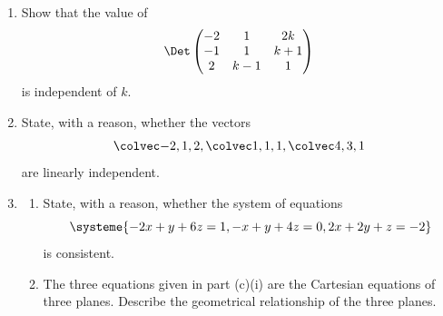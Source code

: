 \begin{problem}
    \begin{enumerate}
        \item Show that the value of \[\Det \begin{pmatrix}-2 & 1 & 2k\\ -1 & 1 & k+1\\ 2 & k-1 & 1\end{pmatrix}\] is independent of $k$.
        \item State, with a reason, whether the vectors \[\cveciii{-2}{1}{2}, \cveciii111, \cveciii431\] are linearly independent.
        \item \begin{enumerate}
            \item State, with a reason, whether the system of equations \[\systeme{-2x+y+6z=1,-x+y+4z=0,2x+2y+z=-2}\] is consistent.
            \item The three equations given in part (c)(i) are the Cartesian equations of three planes. Describe the geometrical relationship of the three planes.
        \end{enumerate}
    \end{enumerate}
\end{problem}
